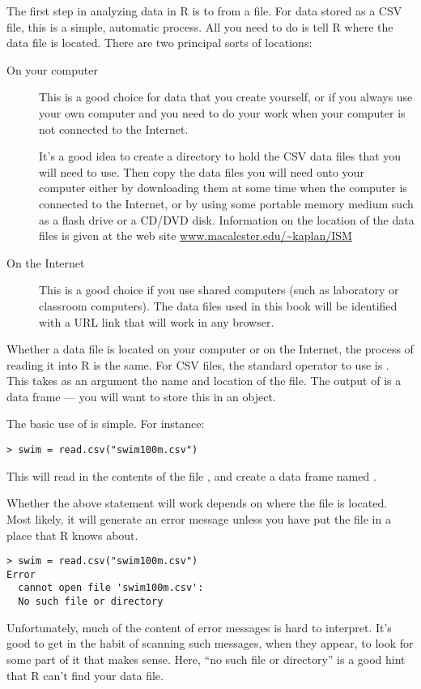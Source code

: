 The first step in analyzing data in R is to 
from a file.  For data stored as a CSV file, 
this is a simple, automatic process.  All you need to do
is tell R where the data file is located.  There are two principal
sorts of locations:
\begin{description}

\item[On your computer] This is a good choice for data that you create
  yourself, or if you always use your own computer and you need to do
  your work when your computer is not connected to the Internet.

  It's a good idea to create a directory to hold the CSV data files
  that you will need to use.  Then copy the data files you will need
  onto your computer either by downloading them at some time when the
  computer is connected to the Internet, or by using some portable
  memory medium such as a flash drive or a CD/DVD disk.  Information
  on the location of the data files is given at the web site
  \url{www.macalester.edu/~kaplan/ISM}


\item[On the Internet] This is a good choice if you use shared
  computers (such as laboratory or classroom computers).  The data
  files used in this book will be identified with a URL link that will
  work in any browser. 
\end{description}

Whether a data file is located on your computer or on the Internet, the
process of reading it into R is the same.  For CSV files, the standard 
operator to use is .  This takes as an argument the name and
location of the file.  The output of  is a data frame
--- you will want to store this in an object. 

The basic use of  is simple.  For instance:
\begin{verbatim}
> swim = read.csv("swim100m.csv")
\end{verbatim}
This will read in the contents of the file , and
create a data frame named .
 
Whether the above statement will work depends on where the file is
located.  Most likely, it will generate an error message unless you
have put the file in a place that R knows about.
\begin{verbatim}
> swim = read.csv("swim100m.csv")
Error 
  cannot open file 'swim100m.csv': 
  No such file or directory
\end{verbatim}  
Unfortunately, much of the content of error messages is hard to interpret.  
It's good to get in the habit of scanning such messages, when they appear, to 
look for some part of it that makes sense.  Here, ``no such file or
directory'' is a good hint that R can't find your data file.
 
